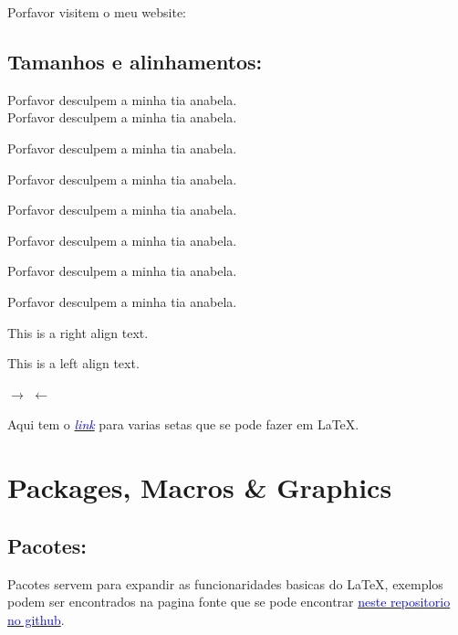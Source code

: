 \documentclass[a4paper]{article}
\begin{document}
Porfavor visitem o meu website: 
\subsection{Tamanhos e alinhamentos:}
\begin{center}

Porfavor desculpem a minha tia anabela.\\

\tiny
Porfavor desculpem a minha tia anabela.

\small
Porfavor desculpem a minha tia anabela.

\normalsize
Porfavor desculpem a minha tia anabela.

\large
Porfavor desculpem a minha tia anabela.

\Large
Porfavor desculpem a minha tia anabela.

\huge
Porfavor desculpem a minha tia anabela.

\Huge
Porfavor desculpem a minha tia anabela.

\end{center}

\begin{flushright}

 This is a right align text.
\end{flushright}

\begin{flushleft}
 This is a left align text.
\end{flushleft}

$\rightarrow$
$\leftarrow$

Aqui tem o \href{http://www.sascha-frank.com/Arrow/latex-arrows.html}{\textit{\textcolor{blue}{link}}} para varias setas que se pode fazer em \LaTeX{}.

\section{Packages, Macros \& Graphics}
\subsection{Pacotes:}
    Pacotes servem para expandir as funcionaridades basicas do \LaTeX{}, exemplos podem ser encontrados na pagina fonte que se pode encontrar \href{https://github.com/OnikenX/LaTeX-showcase}{\textcolor{blue}{neste repositorio no github}}.
\end{document}
